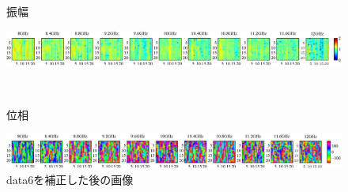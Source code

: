 ﻿\documentclass[12pt,oneside]{jsbook}
\begin{document}
\begin{figure}[hbtp]
 \begin{center}
     \begin{minipage}[c]{0.19\hsize}
振幅
  \end{minipage}
     \begin{minipage}[c]{0.79\hsize}
\includegraphics[width = \hsize ]{20150204_mine6_Bhosei_a.eps}
  \end{minipage}
\\
     \begin{minipage}[c]{0.19\hsize}
位相
  \end{minipage}
     \begin{minipage}[c]{0.8\hsize}
\includegraphics[width =\hsize ]{20150204_mine6_Bhosei_p.eps}
  \end{minipage}
\caption{data6を補正した後の画像}
\label{mine6-hosei}
 \end{center}
\end{figure}
\end{document}
